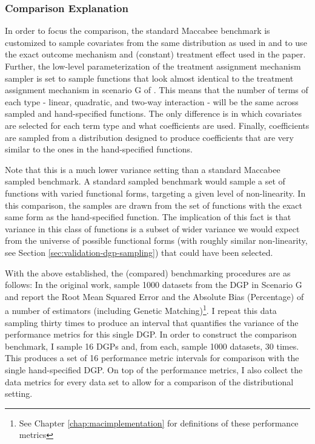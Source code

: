 \documentclass[../main.tex]{subfiles}
\begin{document}
\subsubsection{Comparison Explanation}

In order to focus the comparison, the standard Maccabee benchmark is customized to sample covariates from the same distribution as used in \textcite{Diamond2012GeneticStudies} and to use the exact outcome mechanism and (constant) treatment effect used in the paper. Further, the low-level parameterization of the treatment assignment mechanism sampler is set to sample functions that look almost identical to the treatment assignment mechanism in scenario G of \textcite{Diamond2012GeneticStudies}. This means that the number of terms of each type - linear, quadratic, and two-way interaction - will be the same across sampled and hand-specified functions. The only difference is in which covariates are selected for each term type and what coefficients are used. Finally, coefficients are sampled from a distribution designed to produce coefficients that are very similar to the ones in the hand-specified functions.

\vspace{\baselineskip}

Note that this is a much lower variance setting than a standard Maccabee sampled benchmark. A standard sampled benchmark would sample a set of functions with varied functional forms, targeting a given level of non-linearity. In this comparison, the samples are drawn from the set of functions with the exact same form as the hand-specified function. The implication of this fact is that variance in this class of functions is a subset of wider variance we would expect from the universe of possible functional forms (with roughly similar non-linearity, see Section \ref{sec:validation-dgp-sampling}) that could have been selected.

\vspace{\baselineskip}

With the above established, the (compared) benchmarking procedures are as follows: In the original work, \citeauthor{Diamond2012GeneticStudies} sample 1000 datasets from the DGP in Scenario G and report the Root Mean Squared Error and the Absolute Bias (Percentage) of a number of estimators (including Genetic Matching)\footnote{See Chapter \ref{chap:macimplementation} for definitions of these performance metrics}. I repeat this data sampling thirty times to produce an interval that quantifies the variance of the performance metrics for this single DGP. In order to construct the comparison benchmark, I sample 16 DGPs and, from each, sample 1000 datasets, 30 times. This produces a set of 16 performance metric intervals for comparison with the single hand-specified DGP. On top of the performance metrics, I also collect the data metrics for every data set to allow for a comparison of the distributional setting.
\end{document}
